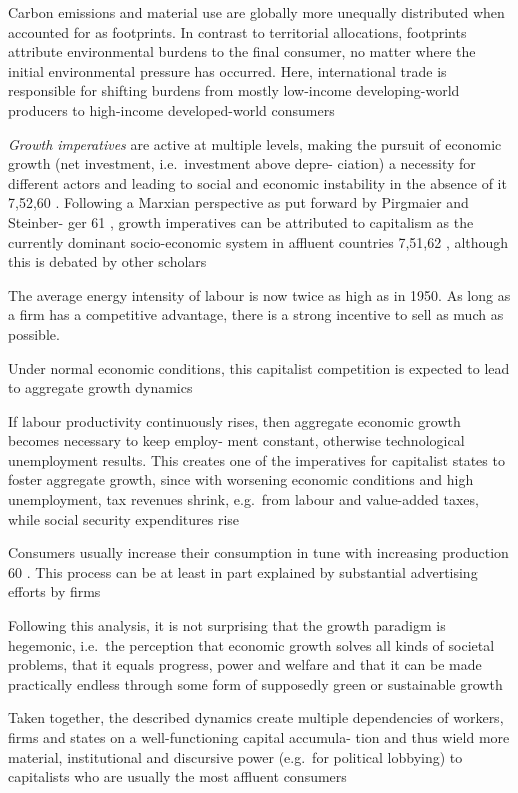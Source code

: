 \documentclass[
]{book}
\begin{document}
Carbon emissions and
material use are globally more unequally distributed when
accounted for as footprints. In contrast to territorial allocations,
footprints attribute environmental burdens to the final consumer,
no matter where the initial environmental pressure has occurred.
Here, international trade is responsible for shifting burdens from
mostly low-income developing-world producers to high-income
developed-world consumers

\emph{Growth imperatives} are active at multiple levels, making the pursuit of
economic growth (net investment, i.e.~investment above depre-
ciation) a necessity for different actors and leading to social and
economic instability in the absence of it 7,52,60 . Following a
Marxian perspective as put forward by Pirgmaier and Steinber-
ger 61 , growth imperatives can be attributed to capitalism as the
currently dominant socio-economic system in affluent
countries 7,51,62 , although this is debated by other scholars

The average energy intensity of labour is
now twice as high as in 1950. As long as a firm has a
competitive advantage, there is a strong incentive to sell as much
as possible.

Under normal economic conditions, this
capitalist competition is expected to lead to aggregate growth
dynamics

If labour productivity continuously rises, then
aggregate economic growth becomes necessary to keep employ-
ment constant, otherwise technological unemployment results.
This creates one of the imperatives for capitalist states to foster
aggregate growth, since with worsening economic conditions and
high unemployment, tax revenues shrink, e.g.~from labour and
value-added taxes, while social security expenditures rise

Consumers
usually increase their consumption in tune with increasing
production 60 . This process can be at least in part explained by
substantial advertising efforts by firms

Following this analysis, it is not surprising that the growth
paradigm is hegemonic, i.e.~the perception that economic growth
solves all kinds of societal problems, that it equals progress, power
and welfare and that it can be made practically endless through
some form of supposedly green or sustainable growth

Taken
together, the described dynamics create multiple dependencies of
workers, firms and states on a well-functioning capital accumula-
tion and thus wield more material, institutional and discursive
power (e.g.~for political lobbying) to capitalists who are usually
the most affluent consumers
\end{document}
